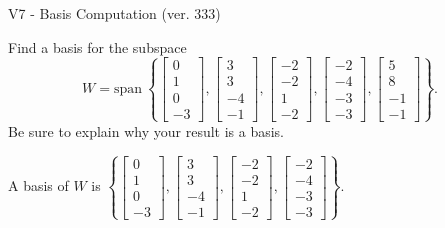 \begin{exercise}
  \begin{exerciseTitle}V7 - Basis Computation (ver. 333)\end{exerciseTitle}
  \begin{exerciseStatement}
    Find a basis for the subspace 
\[W=\mathrm{span}\ \left\{\left[\begin{array}{r}
0 \\
1 \\
0 \\
-3
\end{array}\right] , \left[\begin{array}{r}
3 \\
3 \\
-4 \\
-1
\end{array}\right] , \left[\begin{array}{r}
-2 \\
-2 \\
1 \\
-2
\end{array}\right] , \left[\begin{array}{r}
-2 \\
-4 \\
-3 \\
-3
\end{array}\right] , \left[\begin{array}{r}
5 \\
8 \\
-1 \\
-1
\end{array}\right]\right\}.\]
 Be sure to explain why your result is a basis.


  \end{exerciseStatement}
  \begin{exerciseAnswer}
   A basis of \(W\) is  \(\left\{\left[\begin{array}{r}
0 \\
1 \\
0 \\
-3
\end{array}\right] , \left[\begin{array}{r}
3 \\
3 \\
-4 \\
-1
\end{array}\right] , \left[\begin{array}{r}
-2 \\
-2 \\
1 \\
-2
\end{array}\right] , \left[\begin{array}{r}
-2 \\
-4 \\
-3 \\
-3
\end{array}\right]\right\}\).
  


  \end{exerciseAnswer}
\end{exercise}